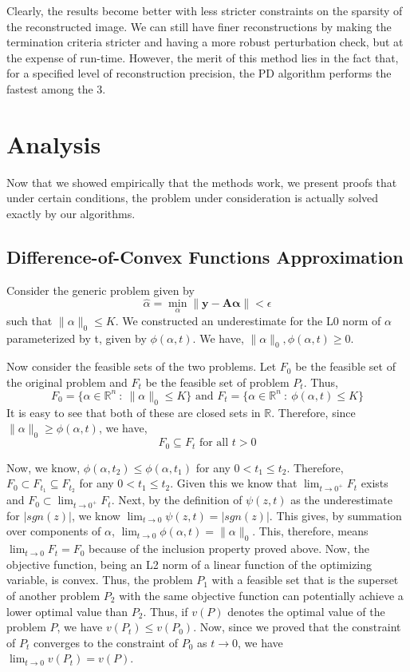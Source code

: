 \documentclass[letterpaper, 10 pt, conference]{article}
\begin{document}
\noindent Clearly, the results become better with less stricter constraints on the sparsity of the reconstructed image. We can still have finer reconstructions by  making the termination criteria stricter and having a more robust perturbation check, but at the expense of run-time. However, the merit of this method lies in the fact that, for a specified level of reconstruction precision, the PD algorithm performs the fastest among the 3.

\section{Analysis}
Now that we showed empirically that the methods work, we present proofs that under certain conditions, the problem under consideration is actually solved exactly by our algorithms.

\subsection{Difference-of-Convex Functions Approximation}
Consider the generic problem given by $$\hat{\alpha} = \min_\alpha \|\mathbf{y} - \mathbf{A \alpha}\| < \epsilon$$
such that $\|\alpha\|_0 \leq K$. We constructed an underestimate for the L0 norm of $\alpha$ parameterized by t, given by $\phi(\alpha, t)$. We have, $\|\alpha\|_0, \phi(\alpha, t) \geq 0$. 

Now consider the feasible sets of the two problems. Let $F_0$ be the feasible set of the original problem and $F_t$ be the feasible set of problem $P_t$. Thus,
$$F_0 = \{ \alpha \in \mathbb{R}^n \ :\ \|\alpha\|_0 \leq K \} \text{ and } F_t = \{ \alpha \in \mathbb{R}^n \ :\ \phi(\alpha, t) \leq K \}$$
It is easy to see that both of these are closed sets in $\mathbb{R}$. Therefore, since $\|\alpha\|_0 \geq \phi(\alpha, t)$, we have, $$F_0 \subseteq F_t \text{ for all } t>0$$

Now, we know, $\phi(\alpha, t_2) \leq \phi(\alpha, t_1)$ for any $0 < t_1 \leq t_2$. Therefore, $F_0 \subset F_{t_1} \subseteq F_{t_2}$ for any $0 < t_1 \leq t_2$. Given this we know that $\lim_{t \rightarrow 0^+} F_t$ exists and $F_0 \subset \lim_{t \rightarrow 0^+} F_t$. Next, by the definition of $\psi(z, t)$ as the underestimate for $|sgn(z)|$, we know $\lim_{t \rightarrow 0} \psi(z, t) = |sgn(z)|$. This gives, by summation over components of $\alpha$, $\lim_{t \rightarrow 0} \phi(\alpha, t) = \|\alpha\|_0$. This, therefore, means $\lim_{t \rightarrow 0} F_t = F_0$ because of the inclusion property proved above. Now, the objective function, being an L2 norm of a linear function of the optimizing variable, is convex. Thus, the problem $P_1$ with a feasible set that is the superset of another problem $P_2$ with the same objective function can potentially achieve a lower optimal value than $P_2$. Thus, if $v(P)$ denotes the optimal value of the problem $P$, we have $v(P_t) \leq v(P_0)$. Now, since we proved that the constraint of $P_t$ converges to the constraint of $P_0$ as $t \rightarrow 0$, we have $\lim_{t \rightarrow 0} v(P_t) = v(P)$.
\end{document}
